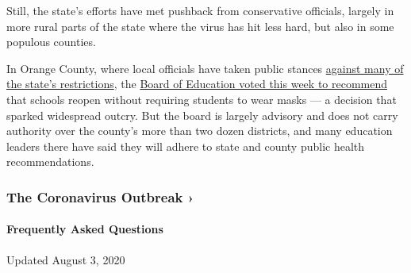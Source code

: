 Still, the state's efforts have met pushback from conservative
officials, largely in more rural parts of the state where the virus has
hit less hard, but also in some populous counties.

In Orange County, where local officials have taken public stances
\href{https://www.nytimes.com/aponline/2020/07/14/us/ap-us-virus-outbreak-school-politics.html}{against
many of the state's restrictions}, the
\href{https://www.ocregister.com/2020/07/15/wagner-chau-back-away-from-controversial-school-board-recommendation/}{Board
of Education voted this week to recommend} that schools reopen without
requiring students to wear masks --- a decision that sparked widespread
outcry. But the board is largely advisory and does not carry authority
over the county's more than two dozen districts, and many education
leaders there have said they will adhere to state and county public
health recommendations.

\href{https://www.nytimes.com/news-event/coronavirus?action=click\&pgtype=Article\&state=default\&region=MAIN_CONTENT_3\&context=storylines_faq}{}

\hypertarget{the-coronavirus-outbreak-}{%
\subsubsection{The Coronavirus Outbreak
›}\label{the-coronavirus-outbreak-}}

\hypertarget{frequently-asked-questions}{%
\paragraph{Frequently Asked
Questions}\label{frequently-asked-questions}}

Updated August 3, 2020


